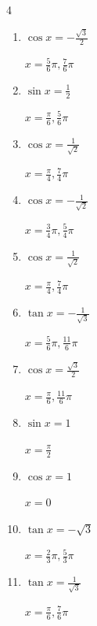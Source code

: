 \begin{multicols}{4}
\begin{enumerate}
        $\displaystyle x = \frac{5}{6}\pi , \frac{11}{6}\pi$

  \item $\displaystyle \cos{x}  = -\frac{\sqrt{3}}{2}$

        $\displaystyle x = \frac{5}{6}\pi , \frac{7}{6}\pi$

  \item $\displaystyle \sin{x}  = \frac{1}{2}$

        $\displaystyle x = \frac{\pi}{6} , \frac{5}{6}\pi$

  \item $\displaystyle \cos{x}  = \frac{1}{\sqrt{2}}$

        $\displaystyle x = \frac{\pi}{4} , \frac{7}{4}\pi$

  \item $\displaystyle \cos{x}  = -\frac{1}{\sqrt{2}}$

        $\displaystyle x = \frac{3}{4}\pi , \frac{5}{4}\pi$

\columnbreak %

  \item $\displaystyle \cos{x}  = \frac{1}{\sqrt{2}}$

        $\displaystyle x = \frac{\pi}{4} , \frac{7}{4}\pi$

  \item $\displaystyle \tan{x}  = -\frac{1}{\sqrt{3}}$

        $\displaystyle x = \frac{5}{6}\pi , \frac{11}{6}\pi$

  \item $\displaystyle \cos{x}  = \frac{\sqrt{3}}{2}$

        $\displaystyle x = \frac{\pi}{6} , \frac{11}{6}\pi$

  \item $\displaystyle \sin{x}  = 1$

        $\displaystyle x = \frac{\pi}{2}$

  \item $\displaystyle \cos{x}  = 1$

        $\displaystyle x = 0$

  \item $\displaystyle \tan{x}  = -\sqrt{3}$

        $\displaystyle x = \frac{2}{3}\pi , \frac{5}{3}\pi$

  \item $\displaystyle \tan{x}  = \frac{1}{\sqrt{3}}$

        $\displaystyle x = \frac{\pi}{6} , \frac{7}{6}\pi$


\end{enumerate}
\end{multicols}
